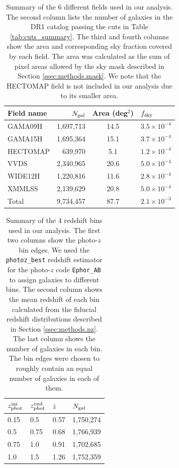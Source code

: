 \documentclass[a4paper,11pt]{article}
\begin{document}
  \begin{table}
  \centering
  \begin{tabular}{|l|r|c|l|}
   \hline
   {\bf Field name} & $N_{\rm gal}$ & {\bf Area} (deg$^2$) & $f_{\rm sky}$ \\
   \hline
   GAMA09H  & 1,697,713 & 14.5 & $3.5\times10^{-4}$ \\
   GAMA15H  & 1,695,364 & 15.1 & $3.7\times10^{-4}$ \\
   HECTOMAP &   639,970 &  5.1 & $1.2\times10^{-4}$ \\
   VVDS     & 2,340,965 & 20.6 & $5.0\times10^{-4}$ \\
   WIDE12H  & 1,220,816 & 11.6 & $2.8\times10^{-4}$ \\
   XMMLSS   & 2,139,629 & 20.8 & $5.0\times10^{-4}$ \\
   \hline
   Total    & 9,734,457 & 87.7 & $2.1\times10^{-3}$ \\
   \hline
  \end{tabular}
  \caption{Summary of the 6 different fields used in our analysis. The second column lists the number of galaxies in the DR1 catalog passing the cuts in Table \ref{tab:cuts_summary}. The third and fourth columns show the area and corresponding sky fraction covered by each field. The area was calculated as the sum of pixel areas allowed by the sky mask described in Section \ref{ssec:methods.mask}. We note that the HECTOMAP field is not included in our analysis due to its smaller area.} \label{tab:field_summary}
  \end{table}  

  \begin{table}
  \centering
  \begin{tabular}{|l|l|l|l|}
    \hline
    $z_{\rm phot}^{\rm ini}$ & $z_{\rm phot}^{\rm end}$ & $\bar{z}$ & $N_{\rm gal}$ \\
    \hline
    0.15 & 0.5  & 0.57 & 1,750,274 \\
    0.5  & 0.75 & 0.68 & 1,766,939 \\
    0.75 & 1.0  & 0.91 & 1,702,685 \\
    1.0  & 1.5  & 1.26 & 1,752,359 \\
    \hline
  \end{tabular}
  \caption{Summary of the 4 redshift bins used in our analysis. The first two columns show the photo-$z$ bin edges. We used the {\tt photoz\_best} redshift estimator for the photo-$z$ code {\tt Ephor\_AB} to assign galaxies to different bins. The second column shows the mean redshift of each bin calculated from the fiducial redshift distributions described in Section \ref{ssec:methods.nz}. The last column shows the number of galaxies in each bin. The bin edges were chosen to roughly contain an equal number of galaxies in each of them.} \label{tab:bins_summary}
  \end{table}
  
\end{document}
